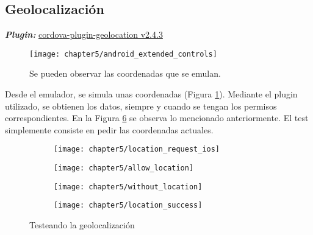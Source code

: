 \subsection*{Geolocalización}
\textbf{\emph{Plugin:}} \href{https://github.com/apache/cordova-plugin-geolocation}{cordova-plugin-geolocation v2.4.3}\\
\begin{figure}[!ht]
    \centering
	\texttt{[image: chapter5/android\_extended\_controls]}
	\caption{Se pueden observar las coordenadas que se emulan.}
	\label{fig:chapter05:android_extended_controls}
\end{figure}
Desde el emulador, se simula unas coordenadas (Figura \ref{fig:chapter05:android_extended_controls}). Mediante el plugin utilizado, se obtienen los datos, siempre y cuando se tengan los permisos correspondientes. En la Figura \ref{fig:chapter05:geolocation_test} se observa lo mencionado anteriormente. El test simplemente consiste en pedir las coordenadas actuales.
\begin{figure}[!ht]
	\begin{subfigure}{.24\textwidth}
	    \centering
		\texttt{[image: chapter5/location\_request\_ios]}
		\label{fig:chapter05:allow_location_ios}
	\end{subfigure}
	\begin{subfigure}{.24\textwidth}
	    \centering
		\texttt{[image: chapter5/allow\_location]}
		\label{fig:chapter05:allow_location_android}
	\end{subfigure}
	\begin{subfigure}{.24\textwidth}
	    \centering
		\texttt{[image: chapter5/without\_location]}
		\label{fig:chapter05:without_location}
	\end{subfigure}
	\begin{subfigure}{.24\textwidth}
	    \centering
		\texttt{[image: chapter5/location\_success]}
		\label{fig:chapter05:location_success}
	\end{subfigure}
	\caption{Testeando la geolocalizaci\'on}
	\label{fig:chapter05:geolocation_test}
\end{figure}\\
\newpage
